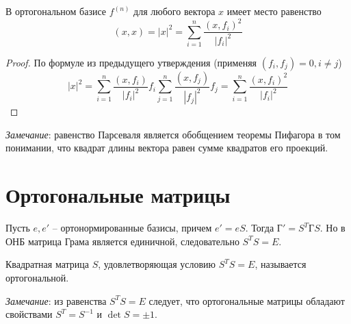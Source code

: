\begin{proposition}
    В ортогональном базисе $f^{(n)}$ для любого вектора $x$ имеет место равенство
    \[
    (x,x)=|x|^2=\sum_{i=1}^n\frac{(x, f_i)^2}{|f_i|^2}
    \]
\end{proposition}
\begin{proof}
    По формуле из предыдущего утверждения (применяя $(f_i,f_j)=0, i\neq j$)
    \[
    |x|^2=\sum_{i=1}^n\frac{(x, f_i)}{|f_i|^2}f_i\sum_{j=1}^n\frac{(x, f_j)}{|f_j|^2}f_j=\sum_{i=1}^n\frac{(x, f_i)^2}{|f_i|^2}
    \]
\end{proof}
\textit{Замечание}: равенство Парсеваля является обобщением теоремы Пифагора в том понимании, что квадрат длины вектора равен сумме квадратов его проекций.

\section{Ортогональные матрицы}
Пусть $e, e'$ -- ортонормированные базисы, причем $e'=eS$. Тогда $\text{Г}'=S^T\text{Г}S$.
Но в ОНБ матрица Грама является единичной, следовательно $S^TS=E$.
\begin{definition}
    Квадратная матрица $S$, удовлетворяющая условию $S^TS=E$, называется ортогональной.
\end{definition}

\textit{Замечание}: из равенства $S^TS=E$ следует, что ортогональные матрицы обладают свойствами $S^T=S^{-1}$ и $\det S=\pm1$.

